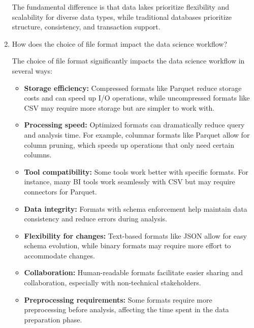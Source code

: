 \documentclass[12pt]{article}
\begin{document}
\begin{enumerate}
\begin{tcolorbox}[colback=blue!5!white,colframe=blue!75!black,title=Solution]
    The fundamental difference is that data lakes prioritize flexibility and scalability for diverse data types, while traditional databases prioritize structure, consistency, and transaction support.
    \end{tcolorbox}
    
    \item How does the choice of file format impact the data science workflow?
    
    \begin{tcolorbox}[colback=blue!5!white,colframe=blue!75!black,title=Solution]
    The choice of file format significantly impacts the data science workflow in several ways:
    
    \begin{itemize}
        \item \textbf{Storage efficiency:} Compressed formats like Parquet reduce storage costs and can speed up I/O operations, while uncompressed formats like CSV may require more storage but are simpler to work with.
        
        \item \textbf{Processing speed:} Optimized formats can dramatically reduce query and analysis time. For example, columnar formats like Parquet allow for column pruning, which speeds up operations that only need certain columns.
        
        \item \textbf{Tool compatibility:} Some tools work better with specific formats. For instance, many BI tools work seamlessly with CSV but may require connectors for Parquet.
        
        \item \textbf{Data integrity:} Formats with schema enforcement help maintain data consistency and reduce errors during analysis.
        
        \item \textbf{Flexibility for changes:} Text-based formats like JSON allow for easy schema evolution, while binary formats may require more effort to accommodate changes.
        
        \item \textbf{Collaboration:} Human-readable formats facilitate easier sharing and collaboration, especially with non-technical stakeholders.
        
        \item \textbf{Preprocessing requirements:} Some formats require more preprocessing before analysis, affecting the time spent in the data preparation phase.
        

\end{itemize}
\end{tcolorbox}
\end{enumerate}
\end{document}
